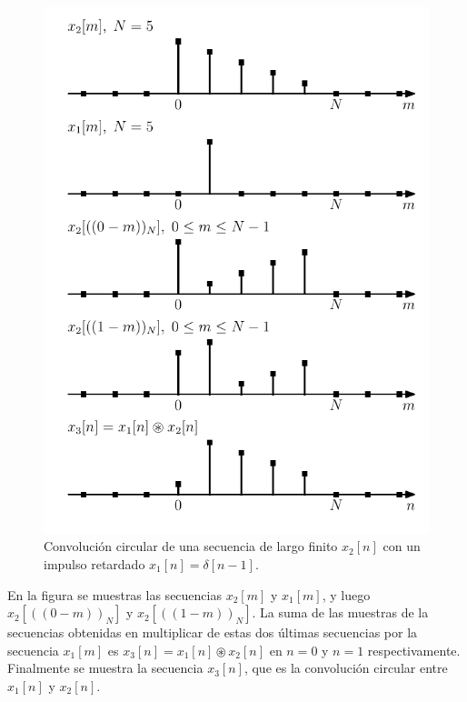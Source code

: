 \documentclass[a4paper]{report}
\begin{document}
\begin{figure}[!htb]
  \begin{minipage}[c]{0.57\textwidth}
    \includegraphics[width=\textwidth]{figuras/dft_properties_circular_convolution_delayed_impulse.pdf}
  \end{minipage}\hfill
  \begin{minipage}[c]{0.33\textwidth}
    \caption{
      Convolución circular de una secuencia de largo finito \(x_2[n]\) con un impulso retardado \(x_1[n]=\delta[n-1]\).
    }\label{fig:dft_properties_circular_convolution_delayed_impulse}
  \end{minipage}
\end{figure}
En la figura se muestras las secuencias \(x_2[m]\) y \(x_1[m]\), y luego \(x_2[((0-m))_N]\) y \(x_2[((1-m))_N]\). 
La suma de las muestras de la secuencias obtenidas en multiplicar de estas dos últimas secuencias por la secuencia \(x_1[m]\) es \(x_3[n]=x_1[n]\circledast x_2[n]\) en \(n=0\) y \(n=1\) respectivamente. Finalmente se muestra la secuencia \(x_3[n]\), que es la convolución circular entre \(x_1[n]\) y \(x_2[n]\).
\end{document}
